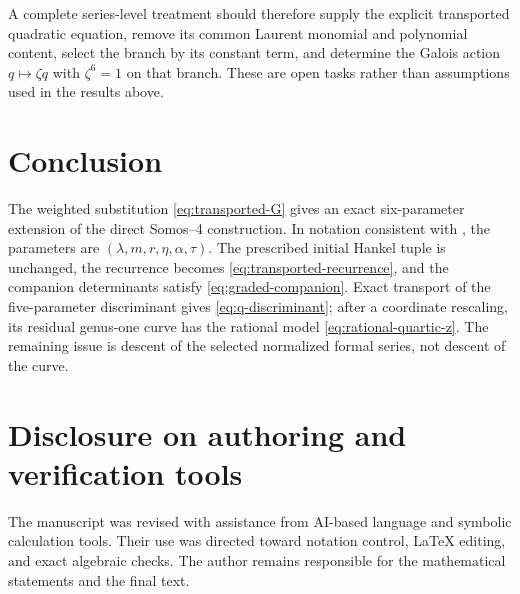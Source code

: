 \documentclass[11pt]{article}
\theoremstyle{definition}
\theoremstyle{remark}
\begin{document}
A complete series-level treatment should therefore supply the explicit
transported quadratic equation, remove its common Laurent monomial and
polynomial content, select the branch by its constant term, and determine the
Galois action $q\mapsto\zeta q$ with $\zeta^6=1$ on that branch.  These are
open tasks rather than assumptions used in the results above.

\section{Conclusion}
The weighted substitution \eqref{eq:transported-G} gives an exact
six-parameter extension of the direct Somos--4 construction.  In notation
consistent with \cite{Scheuerle2026}, the parameters are
$(\lambda,m,r,\eta,\alpha,\tau)$.  The prescribed initial Hankel tuple is
unchanged, the recurrence becomes \eqref{eq:transported-recurrence}, and the
companion determinants satisfy \eqref{eq:graded-companion}.  Exact transport
of the five-parameter discriminant gives \eqref{eq:q-discriminant}; after a
coordinate rescaling, its residual genus-one curve has the rational model
\eqref{eq:rational-quartic-z}.  The remaining issue is descent of the selected
normalized formal series, not descent of the curve.

\section*{Disclosure on authoring and verification tools}
The manuscript was revised with assistance from AI-based language and symbolic
calculation tools.  Their use was directed toward notation control, LaTeX
editing, and exact algebraic checks.  The author remains responsible for the
mathematical statements and the final text.
\end{document}
